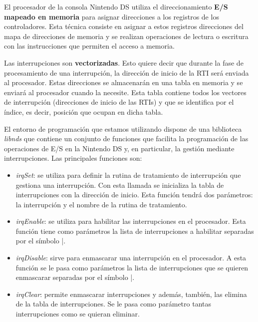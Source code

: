 El procesador de la  consola Nintendo DS  utiliza el direccionamiento  {\bf E/S mapeado en memoria} para asignar direcciones a los registros de los controladores. Esta técnica consiste en asignar a estos registros direcciones del mapa de direcciones de memoria y se realizan operaciones de lectura o escritura con las instrucciones que permiten el acceso a memoria.

Las  interrupciones son {\bf vectorizadas}. Esto quiere decir que durante la fase de procesamiento de una interrupción, la dirección de inicio de la RTI será enviada al procesador. Estas direcciones se almacenarán en una tabla en memoria y se enviará al procesador cuando la necesite. Esta tabla contiene todos los vectores de interrupción (direcciones de inicio de las RTIs) y que se identifica por el índice, es decir, posición que ocupan en dicha tabla.

El entorno de programación que estamos utilizando dispone de una  biblioteca  \textit{libnds} que contiene un conjunto de funciones que  facilita la programación de las operaciones de E/S en la Nintendo  DS y, en particular, la gestión mediante interrupciones. Las principales funciones son:

\begin{itemize}
	\item \textit{irqSet}: se utiliza para definir la rutina de tratamiento de interrupción que  gestiona una interrupción. Con esta llamada  se inicializa la tabla de interrupciones con la dirección de inicio. Esta función tendrá dos parámetros: la interrupción y el nombre de la rutina de tratamiento. 
	\item \textit{irqEnable}: se utiliza para habilitar las interrupciones en el procesador. Esta función tiene como  parámetros la lista de interrupciones a habilitar separadas por el símbolo |. 
	\item \textit{irqDisable}: sirve para enmascarar una interrupción en el procesador. A esta función se le pasa como parámetros la lista de interrupciones que se quieren enmascarar separadas por el símbolo |.
	\item \textit{irqClear}: permite enmascarar interrupciones y además, también, las elimina de la tabla de interrupciones. Se le pasa como parámetro tantas interrupciones como se quieran eliminar. 
\end{itemize}

